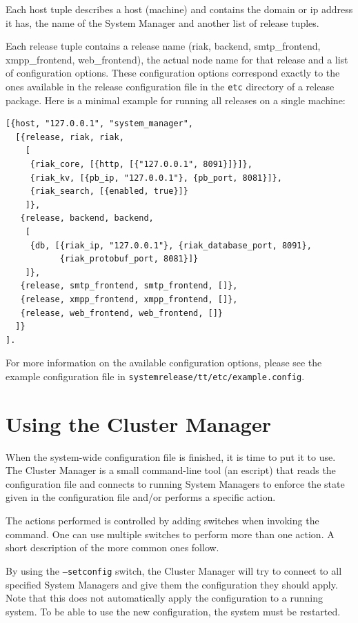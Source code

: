 \documentclass[11pt,a4paper]{report}
\begin{document}
Each host tuple describes a host (machine) and contains the domain or ip address
it has, the name of the System Manager and another list of release tuples.

Each release tuple contains a release name (riak, backend, smtp\_frontend,
xmpp\_frontend, web\_frontend), the actual node name for that release and a list
of configuration options. These configuration options correspond exactly to the
ones available in the release configuration file in the {\tt etc} directory of a
release package. Here is a minimal example for running all releases on a single
machine:

\begin{Verbatim}[samepage=true]
[{host, "127.0.0.1", "system_manager",
  [{release, riak, riak,
    [
     {riak_core, [{http, [{"127.0.0.1", 8091}]}]},
     {riak_kv, [{pb_ip, "127.0.0.1"}, {pb_port, 8081}]},
     {riak_search, [{enabled, true}]}
    ]},
   {release, backend, backend,
    [
     {db, [{riak_ip, "127.0.0.1"}, {riak_database_port, 8091},
           {riak_protobuf_port, 8081}]}
    ]},
   {release, smtp_frontend, smtp_frontend, []},
   {release, xmpp_frontend, xmpp_frontend, []},
   {release, web_frontend, web_frontend, []}
  ]}
].
\end{Verbatim}

\begin{sloppypar}
For more information on the available configuration options, please see the
example configuration file in {\tt system\-release/tt/etc/example.config}.
\end{sloppypar}
\section{Using the Cluster Manager}
When the system-wide configuration file is finished, it is time to put it to
use. The Cluster Manager is a small command-line tool (an escript) that reads
the configuration file and connects to running System Managers to enforce the
state given in the configuration file and/or performs a specific action.

The actions performed is controlled by adding switches when invoking the
command. One can use multiple switches to perform more than one action. A short
description of the more common ones follow.

By using the {\tt --setconfig} switch, the Cluster Manager will try to connect
to all specified System Managers and give them the configuration they should
apply. Note that this does not automatically apply the configuration to a
running system. To be able to use the new configuration, the system must be
restarted.
\end{document}
